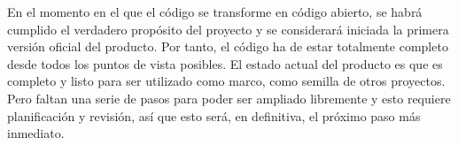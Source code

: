 En el momento en el que el código se transforme en código abierto, se habrá cumplido el verdadero propósito del proyecto y se considerará iniciada la primera versión oficial del producto. Por tanto, el código ha de estar totalmente completo desde todos los puntos de vista posibles. El estado actual del producto es que es completo y listo para ser utilizado como marco, como semilla de otros proyectos. Pero faltan una serie de pasos para poder ser ampliado libremente y esto requiere planificación y revisión, así que esto será, en definitiva, el próximo paso más inmediato.
